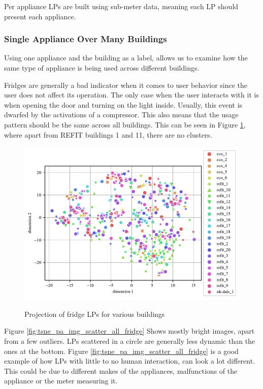Per appliance LPs are built using sub-meter data,
meaning each LP should present each appliance.

\subsubsection{Single Appliance Over Many Buildings}

Using one appliance and the building as a label,
allows us to examine how the same type of appliance is being used across different buildings.

Fridges are generally a bad indicator when it comes to user behavior since the user does not affect its operation. 
The only case when the user interacts with it is when opening the door and turning on the light inside. 
Usually, this event is dwarfed by the activations of a compressor. 
This also means that the usage pattern should be the same across all buildings. 
This can be seen in Figure \ref{fig:tsne_pa_scatter_all_fridge}, 
where apart from REFIT buildings 1 and 11, there are no clusters.


\begin{figure}[H]
	\centering
	\caption{Projection of fridge LPs for various buildings}
	\includegraphics[]{Figures/TSNE/TSNE_per_appliance/scatter_refit_fridge_freeezer_fridge_freezer.pdf}
	\label{fig:tsne_pa_scatter_all_fridge}
\end{figure}

Figure \ref{fig:tsne_pa_img_scatter_all_fridge} Shows mostly bright images, apart from a few outliers.
LPs scattered in a circle are generally less dynamic than the ones at the bottom.
Figure \ref{fig:tsne_pa_img_scatter_all_fridge} is a good example of how LPs with little to no human interaction, can look a lot different. 
This could be due to different makes of the appliances, malfunctions of the appliance or the meter measuring it.

